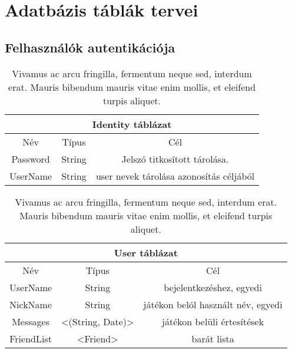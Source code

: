 \chapter{Adatbázis táblák tervei} %
\label{ch:databases_plan}

\section{Felhasználók autentikációja}

\begin{table}[htb]
	\centering
	\begin{tabular}{ |c|c|c| }
		\hline
		\multicolumn{3}{|c|}{Identity táblázat}\\
		\hline
		Név & Típus & Cél \\
		\hline
		Password  & String  & Jelszó titkosított tárolása.  \\
		\hline
		UserName & String & user nevek tárolása azonosítás céljából\\
		\hline
	\end{tabular}
	\caption[Rövid cím a táblázatjegyzékbe]{Vivamus ac arcu fringilla, fermentum neque sed, interdum erat. Mauris bibendum mauris vitae enim mollis, et eleifend turpis aliquet.}
	\label{tab:example-2}
\end{table}


\begin{table}[htb]
	\centering
	\begin{tabular}{ |c|c|c| }
		\hline
		\multicolumn{3}{|c|}{User táblázat}\\
		\hline
		Név & Típus & Cél \\
		\hline
		UserName  & String  & bejelentkezéshez, egyedi  \\
		\hline
		NickName & String & játékon belól használt név, egyedi\\
		\hline
		Messages & <(String, Date)> & játékon belüli értesítések\\
		\hline
		FriendList & <Friend> & barát lista\\
		\hline
	\end{tabular}
	\caption[Rövid cím a táblázatjegyzékbe]{Vivamus ac arcu fringilla, fermentum neque sed, interdum erat. Mauris bibendum mauris vitae enim mollis, et eleifend turpis aliquet.}
	\label{tab:example-2}
\end{table}

